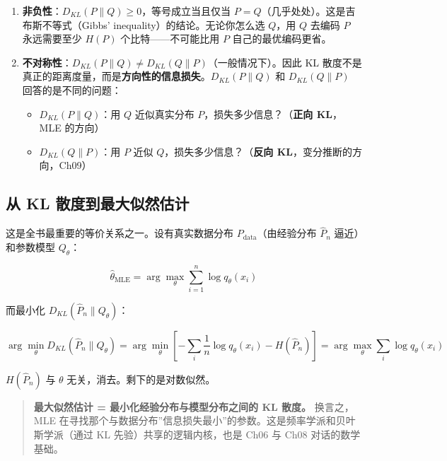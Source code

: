 \documentclass[
]{book}
\providecommand{\tightlist}{%
  \setlength{\itemsep}{0pt}\setlength{\parskip}{0pt}}
\begin{document}
\begin{enumerate}
\def\labelenumi{\arabic{enumi}.}
\item
  \textbf{非负性}：\(D_{KL}(P \parallel Q) \geq 0\)，等号成立当且仅当 \(P = Q\)（几乎处处）。这是吉布斯不等式（Gibbs' inequality）的结论。无论你怎么选 \(Q\)，用 \(Q\) 去编码 \(P\) 永远需要至少 \(H(P)\) 个比特------不可能比用 \(P\) 自己的最优编码更省。
\item
  \textbf{不对称性}：\(D_{KL}(P \parallel Q) \neq D_{KL}(Q \parallel P)\)（一般情况下）。因此 KL 散度不是真正的距离度量，而是\textbf{方向性的信息损失}。\(D_{KL}(P \parallel Q)\) 和 \(D_{KL}(Q \parallel P)\) 回答的是不同的问题：

  \begin{itemize}
  \tightlist
  \item
    \(D_{KL}(P \parallel Q)\)：用 \(Q\) 近似真实分布 \(P\)，损失多少信息？（\textbf{正向 KL}，MLE 的方向）
  \item
    \(D_{KL}(Q \parallel P)\)：用 \(P\) 近似 \(Q\)，损失多少信息？（\textbf{反向 KL}，变分推断的方向，Ch09）
  \end{itemize}
\end{enumerate}

\subsection{从 KL 散度到最大似然估计}\label{ux4ece-kl-ux6563ux5ea6ux5230ux6700ux5927ux4f3cux7136ux4f30ux8ba1}

这是全书最重要的等价关系之一。设有真实数据分布 \(P_{\text{data}}\)（由经验分布 \(\hat{P}_n\) 逼近）和参数模型 \(Q_\theta\)：

\[\hat{\theta}_{\text{MLE}} = \arg\max_\theta \sum_{i=1}^n \log q_\theta(x_i)\]

而最小化 \(D_{KL}(\hat{P}_n \parallel Q_\theta)\)：

\[\arg\min_\theta D_{KL}(\hat{P}_n \parallel Q_\theta) = \arg\min_\theta \left[-\sum_i \frac{1}{n} \log q_\theta(x_i) - H(\hat{P}_n)\right] = \arg\max_\theta \sum_i \log q_\theta(x_i)\]

\(H(\hat{P}_n)\) 与 \(\theta\) 无关，消去。剩下的是对数似然。

\begin{quote}
\textbf{最大似然估计 = 最小化经验分布与模型分布之间的 KL 散度。} 换言之，MLE 在寻找那个与数据分布''信息损失最小''的参数。这是频率学派和贝叶斯学派（通过 KL 先验）共享的逻辑内核，也是 Ch06 与 Ch08 对话的数学基础。
\end{quote}
\end{document}
